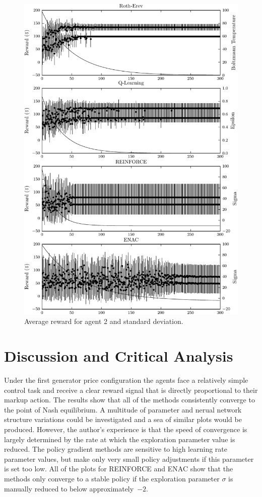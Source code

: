 \begin{figure}
  \centering
  \includegraphics{figures/fig5_2_reward_a2}
  \caption{Average reward for agent 2 and standard deviation.}
  \label{fig:5_2_reward_a2}
\end{figure}

\section{Discussion and Critical Analysis}
Under the first generator price configuration the agents face a
relatively simple control task and receive a clear reward signal that is
directly proportional to their markup action.  The results show that all of the methods consistently
converge to the point of Nash equilibrium.  A multitude of parameter and nerual
network structure variations could be investigated and a sea of similar
plots would be produced.  However, the author's experience is that the speed of
convergence is largely determined by the rate at which the exploration parameter value is reduced.
The policy gradient methods are sensitive to high learning rate parameter
values, but make only very small policy adjustments if this parameter is set
too low. All of the plots for REINFORCE and ENAC show that the methods only converge to a
stable policy if the exploration parameter $\sigma$ is manually reduced to
below approximately~$-2$.

